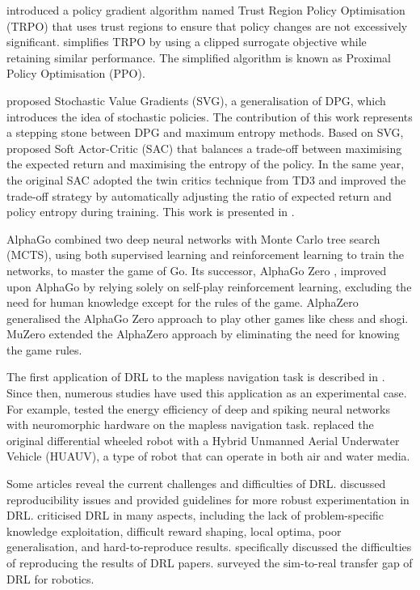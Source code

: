 \cite{ref:trpo} introduced a policy gradient algorithm named Trust Region Policy Optimisation (TRPO) that uses trust regions to ensure that policy changes are not excessively significant. \cite{ref:ppo} simplifies TRPO by using a clipped surrogate objective while retaining similar performance. The simplified algorithm is known as Proximal Policy Optimisation (PPO).

\cite{ref:svg} proposed Stochastic Value Gradients (SVG), a generalisation of DPG, which introduces the idea of stochastic policies. The contribution of this work represents a stepping stone between DPG and maximum entropy methods. Based on SVG, \cite{ref:sac} proposed Soft Actor-Critic (SAC) that balances a trade-off between maximising the expected return and maximising the entropy of the policy. In the same year, the original SAC adopted the twin critics technique from TD3 and improved the trade-off strategy by automatically adjusting the ratio of expected return and policy entropy during training. This work is presented in \cite{ref:sac-auto}.

AlphaGo \cite{ref:alphago} combined two deep neural networks with Monte Carlo tree search (MCTS), using both supervised learning and reinforcement learning to train the networks, to master the game of Go. Its successor, AlphaGo Zero \cite{ref:alphago-zero}, improved upon AlphaGo by relying solely on self-play reinforcement learning, excluding the need for human knowledge except for the rules of the game. AlphaZero \cite{ref:alphazero} generalised the AlphaGo Zero approach to play other games like chess and shogi. MuZero \cite{ref:muzero} extended the AlphaZero approach by eliminating the need for knowing the game rules.

The first application of DRL to the mapless navigation task is described in \cite{ref:virtual2real-drl}. Since then, numerous studies have used this application as an experimental case. For example, \cite{ref:energy-efficient} tested the energy efficiency of deep and spiking neural networks with neuromorphic hardware on the mapless navigation task. \cite{ref:huauv} replaced the original differential wheeled robot with a Hybrid Unmanned Aerial Underwater Vehicle (HUAUV), a type of robot that can operate in both air and water media.

Some articles reveal the current challenges and difficulties of DRL. \cite{ref:drl-that-matters} discussed reproducibility issues and provided guidelines for more robust experimentation in DRL. \cite{ref:drl-doesnt-work-yet} criticised DRL in many aspects, including the lack of problem-specific knowledge exploitation, difficult reward shaping, local optima, poor generalisation, and hard-to-reproduce results. \cite{ref:reproducing-drl} specifically discussed the difficulties of reproducing the results of DRL papers. \cite{ref:sim2real} surveyed the sim-to-real transfer gap of DRL for robotics.
